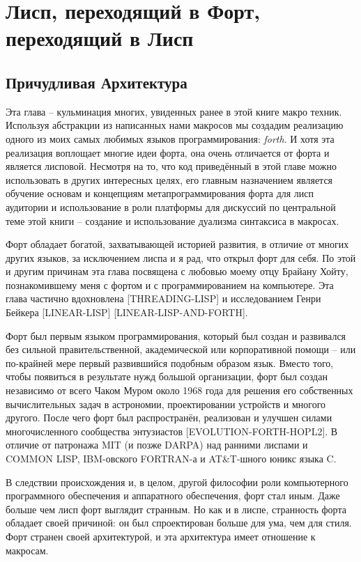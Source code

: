 \chapter{Лисп, переходящий в Форт, переходящий в Лисп}\label{chapter_lisp_forth_lisp}

\section{Причудливая Архитектура}\label{section_wird_design} 

Эта глава -- кульминация многих, увиденных ранее в этой книге макро техник. Используя абстракции из написанных нами макросов мы создадим реализацию одного из моих самых любимых языков программирования: \emph{forth}. И хотя эта реализация воплощает многие идеи форта, она очень отличается от форта и является лисповой. Несмотря на то, что код приведённый в этой главе можно использовать в других интересных целях, его главным назначением является обучение основам и концепциям метапрограммирования форта для лисп аудитории и использование в роли платформы для дискуссий по центральной теме этой книги -- создание и использование дуализма синтаксиса в макросах.

Форт обладает богатой, захватывающей историей развития, в отличие от многих других языков, за исключением лиспа и я рад, что открыл форт для себя. По этой и другим причинам эта глава посвящена с любовью моему отцу Брайану Хойту, познакомившему меня с фортом и с программированием на компьютере. Эта глава частично вдохновлена [THREADING-LISP] и исследованием Генри Бейкера [LINEAR-LISP] [LINEAR-LISP-AND-FORTH].

Форт был первым языком программирования, который был создан и развивался без сильной правительственной, академической или корпоративной помощи -- или по-крайней мере первый развившийся подобным образом язык. Вместо того, чтобы появиться в результате нужд большой организации, форт был создан независимо от всего Чаком Муром около 1968 года для решения его собственных вычислительных задач в астрономии, проектировании устройств и многого другого. После чего форт был распространён, реализован и улучшен силами многочисленного сообщества энтузиастов [EVOLUTION-FORTH-HOPL2]. В отличие от патронажа MIT (и позже DARPA) над ранними лиспами и COMMON LISP, IBM-овского FORTRAN-а и AT\&T-шного юникс языка C.

В следствии происхождения и, в целом, другой философии роли компьютерного программного обеспечения и аппаратного обеспечения, форт стал иным. Даже больше чем лисп форт выглядит странным. Но как и в лиспе, странность форта обладает своей причиной: он был спроектирован больше для ума, чем для стиля. Форт странен своей архитектурой, и эта архитектура имеет отношение к макросам.

